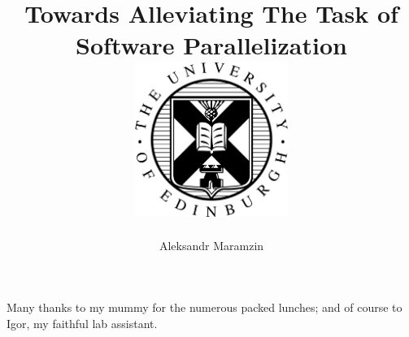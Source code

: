 \documentclass[mphil,icsa,twoside]{infthesis}
\title{
{Towards Alleviating The Task of Software Parallelization}\\
{\includegraphics[width=50mm,scale=0.5]{eushield-normal.pdf}}
}
\author{Aleksandr Maramzin}
\begin{document}
\begin{preliminary}

\maketitle

\begin{acknowledgements}
Many thanks to my mummy for the numerous packed lunches; and of course to
Igor, my faithful lab assistant.
\end{acknowledgements}

\standarddeclaration


\tableofcontents


\end{preliminary}



% 





\appendix







\end{document}
